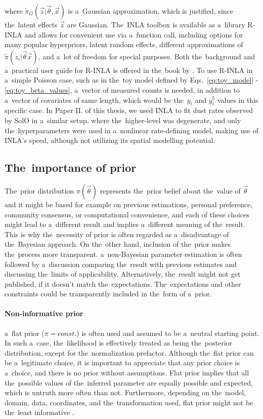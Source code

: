 where $\tilde{\pi}_G(\vec{z}|\vec{\theta},\vec{x})$ is a~Gaussian approximation, which is justified, since the~latent effects $\vec{z}$ are Gaussian. The~INLA toolbox is available as a~library {R-INLA} \citep{rinla} and allows for convenient use via a~function call, including options for many popular hyperpriors, latent random effects, different approximations of $\tilde{\pi}(z_i|\vec{\theta} \vec{x})$, and a~lot of freedom for special purposes. Both the~background and a~practical user guide for R-INLA is offered in the~book by \citet{gomez2020bayesian}. To use R-INLA in a~simple Poisson case, such as in the~toy model defined by Eqs.~\ref{eq:toy_model} - \ref{eq:toy_beta_values}, a~vector of measured counts is needed, in addition to a~vector of covariates of same length, which would be the~$y_i$ and $y_i^5$ values in this specific case. In Paper II. of this thesis, we used INLA to fit dust rates observed by SolO in a~similar setup, where the~higher-level was degenerate, and only the~hyperparameters were used in a~nonlinear rate-defining model, making use of INLA's speed, although not utilizing its spatial modelling potential. 

\subsection{The~importance of prior}

The~prior distribution $\pi(\vec{\theta})$ represents the~prior belief about the~value of $\vec{\theta}$ and it might be based for example on previous estimations, personal preference, community consensus, or computational convenience, and each of these choices might lead to a~different result and implies a~different meaning of the~result. This is why the~necessity of prior is often regarded as a~disadvantage of the~Bayesian approach. On the~other hand, inclusion of the~prior makes the~process more transparent. a~non-Bayesian parameter estimation is often followed by a~discussion comparing the~result with previous estimates and discussing the~limits of applicability. Alternatively, the~result might not get published, if it doesn't match the~expectations. The~expectations and other constraints could be transparently included in the~form of a~prior.

\paragraph{Non-informative prior} a~flat prior ($\pi = const.$) is often used and assumed to be a~neutral starting point. In such a~case, the~likelihood is effectively treated as being the~posterior distribution, except for the~normalization prefactor. Although the~flat prior can be a~legitimate choice, it is important to appreciate that any prior choice is a~choice, and there is no prior without assumptions. Flat prior implies that all the~possible values of the~inferred parameter are equally possible and expected, which is untruth more often than not. Furthermore, depending on the~model, domain, data, coordinates, and the~transformation used, flat prior might not be the~least informative \citep{lemoine2019moving}.

